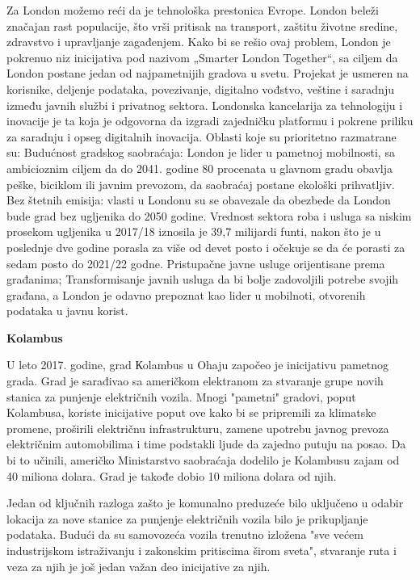 \documentclass[a4paper,12pt]{article}
\begin{document}
{\begin{itemize}
 Za London možemo reći da je tehnološka prestonica Evrope. London beleži značajan rast populacije, što vrši pritisak na transport, zaštitu životne sredine, zdravstvo i upravljanje zagađenjem. Kako bi se rešio ovaj problem, London je pokrenuo niz inicijativa pod nazivom „Smarter London Together“, sa ciljem da London postane jedan od najpametnijih gradova u svetu. Projekat je usmeren na korisnike, deljenje podataka, povezivanje, digitalno vođstvo, veštine i saradnju između javnih službi i privatnog sektora.
Londonska kancelarija za tehnologiju i inovacije je ta koja je odgovorna da izgradi zajedničku platformu i pokrene priliku za saradnju i opseg digitalnih inovacija.
Oblasti koje su prioritetno razmatrane su:
Budućnost gradskog saobraćaja: London je lider u pametnoj mobilnosti, sa ambicioznim ciljem da do 2041. godine 80 procenata u glavnom gradu obavlja peške, biciklom ili javnim prevozom, da
saobraćaj postane ekološki prihvatljiv.
 Bez štetnih emisija: vlasti u Londonu su se obavezale da obezbede da London bude grad bez ugljenika do 2050 godine.
Vrednost sektora roba i usluga sa niskim prosekom ugljenika u 2017/18 iznosila je 39,7 milijardi funti, nakon što je u poslednje dve godine porasla za više od devet posto i očekuje se da će porasti za sedam posto do 2021/22 godne. 
Pristupačne javne usluge orijentisane prema građanima; Transformisanje javnih usluga da bi bolje zadovoljili potrebe svojih građana, a London je odavno prepoznat kao lider u mobilnoti, otvorenih podataka u javnu korist.

 \textbf{Kolambus }
 
 U leto 2017. godine, grad Кolambus u Ohaju započeo je inicijativu pametnog grada. Grad je sarađivao sa američkom elektranom za stvaranje grupe novih stanica za punjenje električnih vozila. Mnogi "pametni" gradovi, poput Kolambusa, koriste inicijative poput ove kako bi se pripremili za klimatske promene, proširili električnu infrastrukturu, zamene upotrebu javnog prevoza  električnim automobilima i time podstakli ljude da zajedno putuju na posao. Da bi to učinili, američko Ministarstvo saobraćaja dodelilo je Kolambusu zajam od 40 miliona dolara. Grad je takođe dobio 10 miliona dolara od njih.

Jedan od ključnih razloga zašto je komunalno preduzeće bilo uključeno u odabir lokacija za nove stanice za punjenje električnih vozila bilo je prikupljanje podataka.
Budući da su samovozeća vozila trenutno izložena "sve većem industrijskom istraživanju i zakonskim pritiscima širom sveta", stvaranje ruta i veza za njih je još jedan važan deo inicijative za njih.
\end{itemize} 



}
\end{document}
